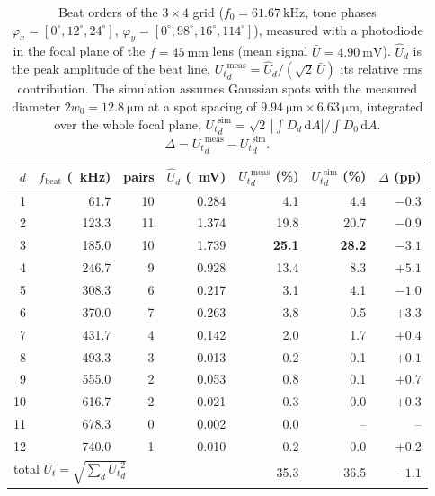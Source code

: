 \begin{table}[h]
\centering
\small
\begin{tabular}{rrrrrrr}
\hline
$d$ & $f_{\text{beat}}$ (\SI{}{\kilo\hertz}) & pairs & $\hat U_d$ (\SI{}{\milli\volt}) & ${U_{t}}_d^{\text{meas}}$ (\%) & ${U_{t}}_d^{\text{sim}}$ (\%) & $\Delta$ (pp) \\ \hline
1  & 61.7  & 10 & 0.284  & 4.1           & 4.4           & $-0.3$ \\
2  & 123.3 & 11 & 1.374  & 19.8          & 20.7          & $-0.9$ \\
3  & 185.0 & 10 & 1.739  & \textbf{25.1} & \textbf{28.2} & $-3.1$ \\
4  & 246.7 & 9  & 0.928  & 13.4          & 8.3           & $+5.1$ \\
5  & 308.3 & 6  & 0.217  & 3.1           & 4.1           & $-1.0$ \\
6  & 370.0 & 7  & 0.263  & 3.8           & 0.5           & $+3.3$ \\
7  & 431.7 & 4  & 0.142  & 2.0           & 1.7           & $+0.4$ \\
8  & 493.3 & 3  & 0.013  & 0.2           & 0.1           & $+0.1$ \\
9  & 555.0 & 2  & 0.053  & 0.8           & 0.1           & $+0.7$ \\
10 & 616.7 & 2  & 0.021  & 0.3           & 0.0           & $+0.3$ \\
11 & 678.3 & 0  & 0.002  & 0.0           & --            & --     \\
12 & 740.0 & 1  & 0.010  & 0.2           & 0.0           & $+0.2$ \\ \hline
\multicolumn{4}{l}{total $U_t=\sqrt{\sum_d {U_t}_d^2}$} & 35.3 & 36.5 & $-1.1$ \\ \hline
\end{tabular}
\caption{Beat orders of the $3\times4$ grid ($f_0=\SI{61.67}{\kilo\hertz}$, tone phases
$\varphi_x=[0^\circ,12^\circ,24^\circ]$, $\varphi_y=[0^\circ,98^\circ,16^\circ,114^\circ]$),
measured with a photodiode in the focal plane of the $f=\SI{45}{\milli\metre}$ lens
(mean signal $\bar U=\SI{4.90}{\milli\volt}$). $\hat U_d$ is the peak amplitude of the beat line,
${U_t}_d^{\text{meas}}=\hat U_d/(\sqrt{2}\,\bar U)$ its relative rms contribution.
The simulation assumes Gaussian spots with the measured diameter $2w_0=\SI{12.8}{\micro\metre}$
at a spot spacing of $\SI{9.94}{\micro\metre}\times\SI{6.63}{\micro\metre}$, integrated over the
whole focal plane, ${U_t}_d^{\text{sim}}=\sqrt{2}\,|\!\int D_d\,\mathrm{d}A|/\!\int D_0\,\mathrm{d}A$.
$\Delta = {U_t}_d^{\text{meas}}-{U_t}_d^{\text{sim}}$.}
\label{tab:beat_focal34}
\end{table}
